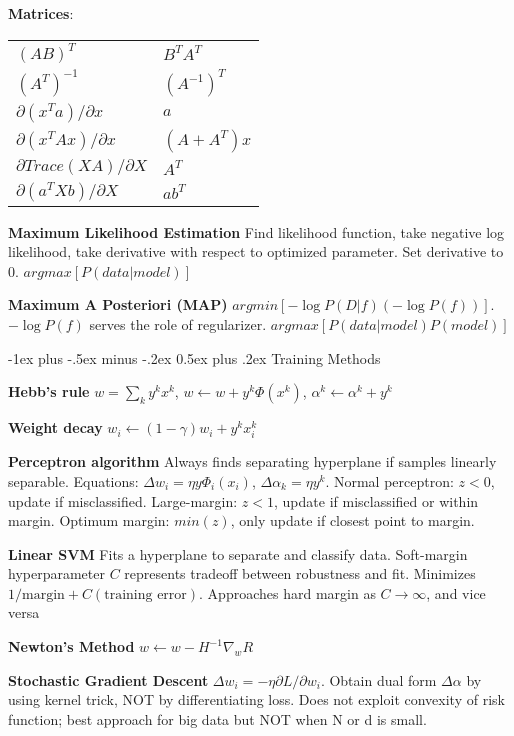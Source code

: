 \documentclass[10pt,landscape]{article}
\makeatletter
\renewcommand{\section}{\@startsection{section}{1}{0mm}%
                                {-1ex plus -.5ex minus -.2ex}%
                                {0.5ex plus .2ex}%
                                {\normalfont\large\bfseries}}
\makeatother
\begin{document}
\begin{multicols}{3}
\textbf{Matrices}:

\begin{tabular}{@{}ll@{}}
$(AB)^T$                            & $B^T A^T$ \\
$(A^T)^{-1}$                        & $(A^{-1})^T$ \\
$\partial(x^T a) / \partial x$      & $a$ \\
$\partial(x^T Ax) / \partial x$     & $(A + A^T) x$ \\
$\partial Trace(XA) / \partial X$   & $A^T$ \\
$\partial(a^T Xb) / \partial X$     & $ab^T$
\end{tabular}

\textbf{Maximum Likelihood Estimation} Find likelihood function, take negative log likelihood, take derivative with respect to optimized parameter. Set derivative to 0. $argmax[P(data|model)]$

\textbf{Maximum A Posteriori (MAP)} $argmin [-\log P(D|f) (-\log P(f))]$. $-\log P(f)$ serves the role of regularizer. $argmax[P(data|model)P(model)]$


\section{Training Methods}

\textbf{Hebb's rule} $w = \sum_k y^k x^k$, $w \leftarrow w + y^k \Phi(x^k)$, $\alpha^k \leftarrow \alpha^k + y^k$

\textbf{Weight decay} $w_i \leftarrow (1 - \gamma) w_i + y^k x_i^k$

\textbf{Perceptron algorithm} Always finds separating hyperplane if samples linearly separable. Equations: $\Delta w_i = \eta y \Phi_i(x_i)$, $\Delta \alpha_k = \eta y^k$. Normal perceptron: $z < 0$, update if misclassified. Large-margin: $z < 1$, update if misclassified or within margin. Optimum margin: $min(z)$, only update if closest point to margin.

\textbf{Linear SVM} Fits a hyperplane to separate and classify data. Soft-margin hyperparameter $C$ represents tradeoff between robustness and fit. Minimizes $1/\text{margin} + C(\text{training error})$. Approaches hard margin as $C\rightarrow\infty$, and vice versa

\textbf{Newton's Method} $w \leftarrow w - H^{-1}\nabla_w R$

\textbf{Stochastic Gradient Descent} $\Delta w_i = -\eta \partial L / \partial w_i$. Obtain dual form $\Delta \alpha$ by using kernel trick, NOT by differentiating loss. Does not exploit convexity of risk function; best approach for big data but NOT when N or d is small.


\end{multicols}
\end{document}
